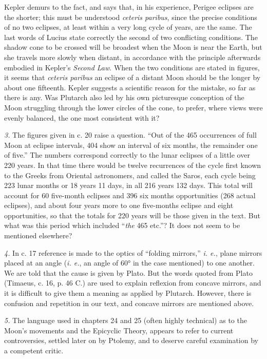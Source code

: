 \documentclass[a4paper, 11pt, oneside, polutonikogreek, english]{article}
\begin{document}
Kepler demurs to the fact, and says that, in his experience, Perigee eclipses are the shorter; this must be understood \emph{ceteris paribus}, since the precise conditions of no two eclipses, at least within a very long cycle of years, are the same. The last words of Lucius state correctly the second of two conflicting conditions. The shadow cone to be crossed will be broadest when the Moon is near the Earth, but she travels more slowly when distant, in accordance with the principle afterwards embodied in Kepler's \emph{Second Law}. When the two conditions are stated in figures, it seems that \emph{ceteris paribus} an eclipse of a distant Moon should be the longer by about one fifteenth. Kepler suggests a scientific reason for the mistake, so far as there is any. Was Plutarch also led by his own picturesque conception of the Moon struggling through the lower circles of the cone, to prefer, where views were evenly balanced, the one most consistent with it?

\emph{3.} The figures given in c. 20 raise a question. ``Out of the 465 occurrences of full Moon at eclipse intervals, 404 show an interval of six months, the remainder one of five.'' The numbers correspond correctly to the lunar eclipses of a little over 220 years. In that time there would be twelve recurrences of the cycle first known to the Greeks from Oriental astronomers, and called the Saros, each cycle being 223 lunar months or 18 years 11 days, in all 216 years 132 days. This total will account for 60 five-month eclipses and 396 six months opportunities (268 actual eclipses), and about four years more to one five-months eclipse and eight opportunities, so that the totals for 220 years will be those given in the text. But what was this period which included ``\emph{the} 465 etc.''? It does not seem to be mentioned elsewhere?

\emph{4.} In c. 17 reference is made to the optics of ``folding mirrors,'' \emph{i. e.}, plane mirrors placed at an angle (\emph{i. e.}, an angle of 60° in the case mentioned) to one another. We are told that the cause is given by Plato. But the words quoted from Plato (Timaeus, c. 16, p. 46 C.) are used to explain reflexion from concave mirrors, and it is difficult to give them a meaning as applied by Plutarch. However, there is confusion and repetition in our text, and concave mirrors are mentioned above.

\emph{5.} The language used in chapters 24 and 25 (often highly technical) as to the Moon's movements and the Epicyclic Theory, appears to refer to current controversies, settled later on by Ptolemy, and to deserve careful examination by a competent critic.
\end{document}
